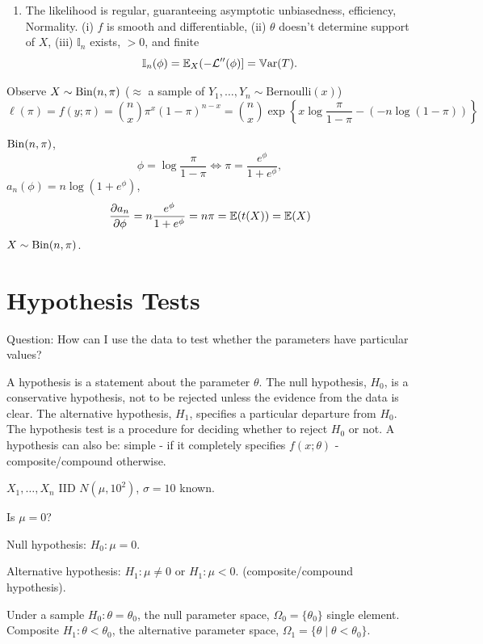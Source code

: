\documentclass[10pt, a4paper]{article}
\begin{document}
\begin{proposition}
\begin{enumerate}[label = (\roman*)]
        \item The likelihood is regular,
        guaranteeing asymptotic unbiasedness,
        efficiency,
        Normality.
        (i)
        $f$ is smooth and differentiable,
        (ii)
        $\theta$ doesn't determine support of $X$,
        (iii)
        $\mathbb{I}_n$ exists,
        $> 0$,
        and finite
        \[
        \mathbb{I}_n(\phi) = \E_{X}(-\mathcal{L}''(\phi)] = \Var(T).
        \]
    \end{enumerate}
\end{proposition}

\begin{example}
    Observe $X \sim \Bin(n, \pi)$
    ($\approx$ a sample of $Y_1, \dotsc, Y_n \sim \mathrm{Bernoulli}(x)$)
    \[
    \ell(\pi) = f(y; \pi) = \binom{n}{x}\pi ^ x(1 - \pi) ^ {n - x} = \binom{n}{x}\exp\left\{x\log\frac{\pi}{1 - \pi} - (-n\log(1 - \pi))\right\}
    \]
\end{example}

\begin{example}
    $\Bin(n, \pi)$,
    \[
    \phi = \log{\frac{\pi}{1 - \pi}} \iff \pi = \frac{e ^ {\phi}}{1 + e ^ {\phi}},
    \]
    $a_n(\phi) = n\log(1 + e ^ {\phi})$,
    \[
    \pd[a_n]{\phi} = n\frac{e ^ {\phi}}{1 + e ^ {\phi}} = n\pi = \E(t(X)) = \E(X)
    \]
    $X \sim \Bin(n, \pi)$.
\end{example}

\newpage

\section{Hypothesis Tests}

Question:
How can I use the data to test whether the parameters have particular values?

\begin{definition}
    A hypothesis is a statement about the parameter $\theta$.
    The null hypothesis,
    $H_0$,
    is a conservative hypothesis,
    not to be rejected unless the evidence from the data is clear.
    The alternative hypothesis,
    $H_1$,
    specifies a particular departure from $H_0$.
    The hypothesis test is a procedure for deciding whether to reject $H_0$ or not.
    A hypothesis can also be:
    simple -
    if it completely specifies $f(x; \theta)$ -
    composite/compound otherwise.
\end{definition}

\begin{example}
    $X_1, \dotsc, X_n$ IID $N(\mu, 10 ^ 2)$,
    $\sigma = 10$ known.

    Is $\mu = 0$?

    Null hypothesis:
    $H_0 : \mu = 0$.
    
    Alternative hypothesis:
    $H_1 : \mu \neq 0$ or $H_1 : \mu < 0$.
    (composite/compound hypothesis).

    Under a sample $H_0 : \theta = \theta_0$,
    the null parameter space,
    $\Omega_0 = \{\theta_0\}$ single element.
    Composite $H_1 : \theta < \theta_0$,
    the alternative parameter space,
    $\Omega_1 = \{\theta \mid \theta < \theta_0\}$.
\end{example}
\end{document}
